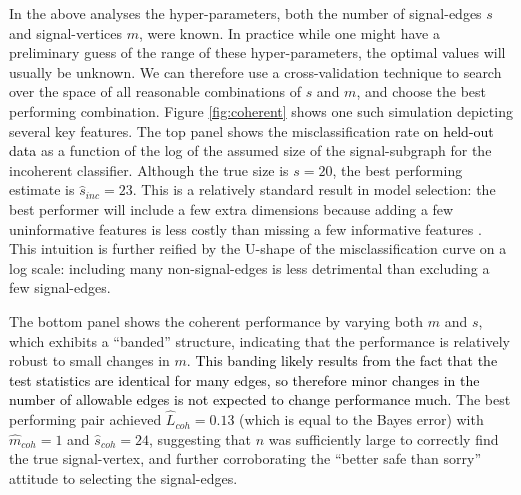 \documentclass[10pt,journal,cspaper,compsoc]{IEEEtran}
\providecommand{\tk}[1]{\textcolor{black}{#1}}
\providecommand{\wh}[1]{\widehat{#1}}
\begin{document}
In the above analyses the hyper-parameters, both the number of signal-edges $s$ and signal-vertices $m$, were known.  In practice while one might have a preliminary guess of the range of these hyper-parameters, the optimal values will usually be unknown.  We can therefore use a cross-validation technique to search over the space of all reasonable combinations of $s$ and $m$, and choose the best performing combination.  Figure \ref{fig:coherent} shows one such simulation depicting several key features.  The top panel shows the misclassification rate \tk{on held-out data} as a function of the log of the assumed size of the signal-subgraph for the incoherent classifier.  Although the true size is $s=20$, the best performing estimate is $\wh{s}_{inc}=23$. This is a relatively standard result in model selection: the best performer will include a few extra dimensions because adding a few uninformative features is less costly than missing a few informative features \cite{Jain2000}.  This intuition is further reified by the U-shape of the misclassification curve on a log scale: including many non-signal-edges is less detrimental than excluding a few signal-edges.

The bottom panel shows the coherent performance by varying both $m$ and $s$, which exhibits a ``banded''  structure, indicating that the performance is relatively robust to small changes in $m$.  \tk{This banding likely results from the fact that the test statistics are identical for many edges, so therefore minor changes in the number of allowable edges is not expected to change performance much.}
The best performing pair achieved $\wh{L}_{coh}=0.13$ (which is equal to the Bayes error) with $\wh{m}_{coh}=1$ and $\wh{s}_{coh}=24$, suggesting that $n$ was sufficiently large to correctly find the true signal-vertex, and further corroborating the ``better safe than sorry'' attitude to selecting the signal-edges. 
\end{document}
